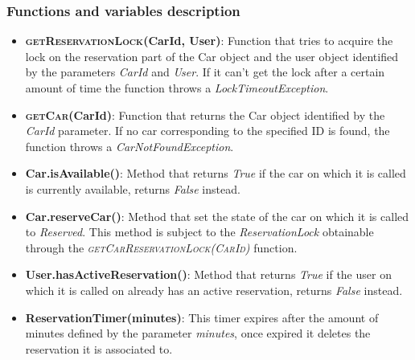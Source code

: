 \subsubsection{Functions and variables description}
\begin{itemize}
	\item \textbf{\textsc{getReservationLock}(CarId, User)}: Function that tries to acquire the lock on the
                                                           reservation part of the Car object and the
                                                           user object identified by the parameters
                                                           \textit{CarId} and \textit{User}.
                                                           If it can't get the lock after a certain
                                                           amount of time the function throws a
                                                           \textit{LockTimeoutException}.
	\item \textbf{\textsc{getCar}(CarId)}: Function that returns the Car object identified by the
                                         \textit{CarId} parameter.
                                         If no car corresponding to the specified ID is found, the
                                         function throws a \textit{CarNotFoundException}.
	\item \textbf{Car.isAvailable()}: Method that returns \textit{True} if the car on which it is called
                                    is currently available, returns \textit{False} instead.
	\item \textbf{Car.reserveCar()}: Method that set the state of the car on which it is called to
                                   \textit{Reserved}.
                                   This method is subject to the \textit{ReservationLock} obtainable
                                   through the \textit{\textsc{getCarReservationLock(CarId)}} function.
	\item \textbf{User.hasActiveReservation()}: Method that returns \textit{True} if the user on
                                                       which it is called on already has an active
                                                       reservation, returns \textit{False} instead.
	\item \textbf{ReservationTimer(minutes)}: This timer expires after the amount of minutes defined by the
                                            parameter \textit{minutes}, once expired it deletes the
                                            reservation it is associated to.

\end{itemize}
